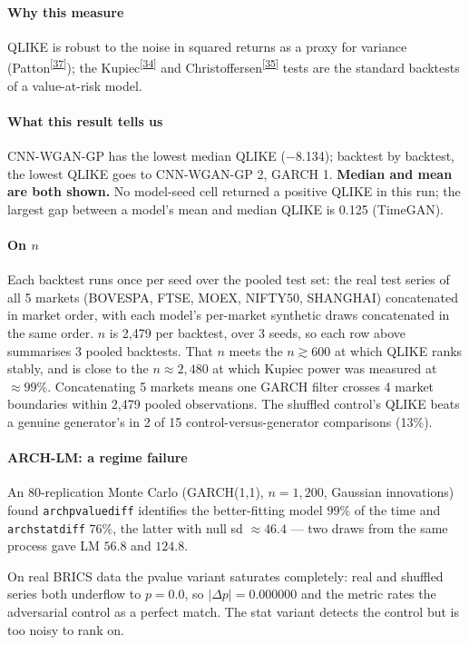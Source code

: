 \documentclass[11pt,a4paper]{article}
\makeatletter
\newcommand{\tcite}[1]{\textsuperscript{[\hyperlink{R:#1}{#1}]}}
\DeclareRobustCommand{\_}{\ifmmode\nfss@text{\textunderscore}\else\textunderscore\allowbreak\fi}
\makeatother
\begin{document}
\paragraph{Why this measure} QLIKE is robust to the noise in squared returns as a proxy for variance (Patton\tcite{37}); the Kupiec\tcite{34} and Christoffersen\tcite{35} tests are the standard backtests of a value-at-risk model.

\paragraph{What this result tells us} CNN-WGAN-GP has the lowest median QLIKE ($-$8.134); backtest by backtest, the lowest QLIKE goes to CNN-WGAN-GP 2, GARCH 1. \textbf{Median and mean are both shown.} No model-seed cell returned a positive QLIKE in this run; the largest gap between a model's mean and median QLIKE is 0.125 (TimeGAN).

\paragraph{On $n$} Each backtest runs once per seed over the pooled test set: the real test series of all 5 markets (BOVESPA, FTSE, MOEX, NIFTY50, SHANGHAI) concatenated in market order, with each model's per-market synthetic draws concatenated in the same order. $n$ is 2,479 per backtest, over 3 seeds, so each row above summarises 3 pooled backtests. That $n$ meets the $n\gtrsim600$ at which QLIKE ranks stably, and is close to the $n\approx2{,}480$ at which Kupiec power was measured at $\approx99\%$. Concatenating 5 markets means one GARCH filter crosses 4 market boundaries within 2,479 pooled observations. The shuffled control's QLIKE beats a genuine generator's in 2 of 15 control-versus-generator comparisons (13\%).

\paragraph{ARCH-LM: a regime failure} An 80-replication Monte Carlo (GARCH(1,1), $n=1{,}200$, Gaussian innovations) found \texttt{arch\_pvalue\_diff} identifies the better-fitting model $99\%$ of the time and \texttt{arch\_stat\_diff} $76\%$, the latter with null sd $\approx46.4$ --- two draws from the same process gave LM $56.8$ and $124.8$.

On real BRICS data the pvalue variant saturates completely: real and shuffled series both underflow to $p=0.0$, so $|\Delta p| = 0.000000$ and the metric rates the adversarial control as a perfect match. The stat variant detects the control but is too noisy to rank on.
\end{document}
